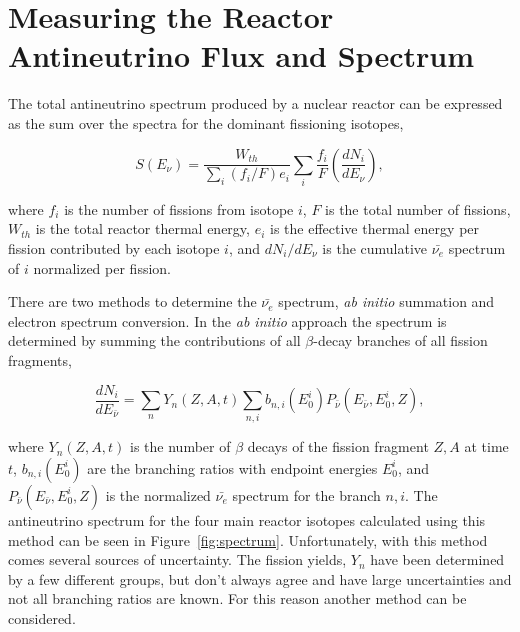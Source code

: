 \section{Measuring the Reactor Antineutrino Flux and Spectrum}

The total antineutrino spectrum produced by a nuclear reactor can be expressed as the sum over the spectra for the dominant fissioning isotopes,

\begin{equation}
	S(E_\nu) = \frac{W_{th}}{\sum_{i}(f_i/F)e_i}\sum_{i}\frac{f_i}{F}\left(\frac{dN_i}{dE_\nu}\right) ,
\end{equation}

where $f_i$ is the number of fissions from isotope $i$, $F$ is the total number of fissions, $W_{th}$ is the total reactor thermal energy, $e_i$ is the effective thermal energy per fission contributed by each isotope $i$, and $dN_i/dE_\nu$ is the cumulative $\bar{\nu_e}$ spectrum of $i$ normalized per fission.

There are two methods to determine the $\bar{\nu_e}$ spectrum, \textit{ab initio} summation and electron spectrum conversion.
In the \textit{ab initio} approach the spectrum is determined by summing the contributions of all $\beta$-decay branches of all fission fragments,

\begin{equation}
	\frac{dN_i}{dE_{\bar{\nu}}} =  \sum_{n}Y_n(Z,A,t)\sum_{n,i}b_{n,i}(E^i_0)P_{\bar{\nu}}(E_{\bar{\nu}},E^i_0,Z) ,
\end{equation}

where $Y_n(Z,A,t)$ is the number of $\beta$ decays of the fission fragment $Z, A$ at time $t$, $b_{n,i}(E^i_0)$ are the branching ratios with endpoint energies $E^i_0$, and $P_{\bar{\nu}}(E_{\bar{\nu}},E^i_0,Z)$ is the normalized $\bar{\nu_e}$ spectrum for the branch $n, i$.
The antineutrino spectrum for the four main reactor isotopes calculated using this method can be seen in Figure~\ref{fig:spectrum}. 
Unfortunately, with this method comes several sources of uncertainty. 
The fission yields, $Y_n$ have been determined by a few different groups, but don't always agree and have large uncertainties and not all branching ratios are known. 
For this reason another method can be considered. 

